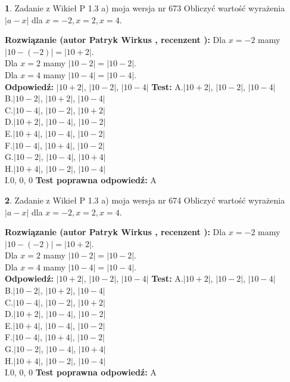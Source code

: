 \documentclass[12pt, a4paper]{article}
\theoremstyle{definition} %
\newtheorem{zad}{}
\newcommand{\zadStart}[1]{\begin{zad}#1\newline}
\newcommand{\zadStop}{\end{zad}}
\newcommand{\rozwStart}[2]{\noindent \textbf{Rozwiązanie (autor #1 , recenzent #2): }\newline}
\newcommand{\rozwStop}{\newline}
\newcommand{\odpStart}{\noindent \textbf{Odpowiedź:}\newline}
\newcommand{\odpStop}{\newline}
\newcommand{\testStart}{\noindent \textbf{Test:}\newline}
\newcommand{\testStop}{\newline}
\newcommand{\kluczStart}{\noindent \textbf{Test poprawna odpowiedź:}\newline}
\newcommand{\kluczStop}{\newline}
\begin{document}
\zadStart{Zadanie z Wikieł P 1.3 a) moja wersja nr 673}
Obliczyć wartość wyrażenia $|a - x|$ dla $x=-2,x=2,x=4$.
\zadStop
\rozwStart{Patryk Wirkus}{}
Dla $x = -2$ mamy $|10 - (-2)| = |10 + 2|$.\\
Dla $x = 2$ mamy $|10 - 2| = |10 - 2|$.\\
Dla $x = 4$ mamy $|10 - 4| = |10 - 4|$.\\
\rozwStop
\odpStart
$|10 + 2|$, $|10 - 2|$, $|10 - 4|$
\odpStop
\testStart
A.$|10 + 2|$, $|10 - 2|$, $|10 - 4|$\\
B.$|10 - 2|$, $|10 + 2|$, $|10 - 4|$\\
C.$|10 - 4|$, $|10 - 2|$, $|10 + 2|$\\
D.$|10 + 2|$, $|10 - 4|$, $|10 - 2|$\\
E.$|10 + 4|$, $|10 - 4|$, $|10 - 2|$\\
F.$|10 - 4|$, $|10 + 4|$, $|10 - 2|$\\
G.$|10 - 2|$, $|10 - 4|$, $|10 + 4|$\\
H.$|10 + 4|$, $|10 - 2|$, $|10 - 4|$\\
I.$0$, $0$, $0$
\testStop
\kluczStart
A
\kluczStop



\zadStart{Zadanie z Wikieł P 1.3 a) moja wersja nr 674}
Obliczyć wartość wyrażenia $|a - x|$ dla $x=-2,x=2,x=4$.
\zadStop
\rozwStart{Patryk Wirkus}{}
Dla $x = -2$ mamy $|10 - (-2)| = |10 + 2|$.\\
Dla $x = 2$ mamy $|10 - 2| = |10 - 2|$.\\
Dla $x = 4$ mamy $|10 - 4| = |10 - 4|$.\\
\rozwStop
\odpStart
$|10 + 2|$, $|10 - 2|$, $|10 - 4|$
\odpStop
\testStart
A.$|10 + 2|$, $|10 - 2|$, $|10 - 4|$\\
B.$|10 - 2|$, $|10 + 2|$, $|10 - 4|$\\
C.$|10 - 4|$, $|10 - 2|$, $|10 + 2|$\\
D.$|10 + 2|$, $|10 - 4|$, $|10 - 2|$\\
E.$|10 + 4|$, $|10 - 4|$, $|10 - 2|$\\
F.$|10 - 4|$, $|10 + 4|$, $|10 - 2|$\\
G.$|10 - 2|$, $|10 - 4|$, $|10 + 4|$\\
H.$|10 + 4|$, $|10 - 2|$, $|10 - 4|$\\
I.$0$, $0$, $0$
\testStop
\kluczStart
A
\kluczStop
\end{document}
